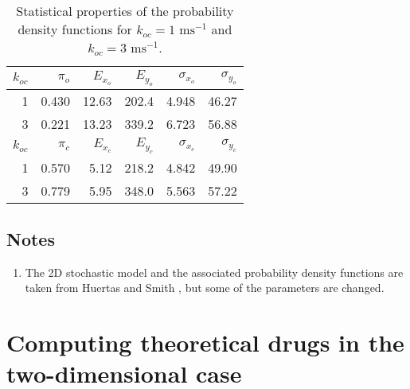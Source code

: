 

\begin{table}  \begin{center}
\begin{tabular}
[c]{|r|r|r|r||r|r|}\hline 
\rule{0pt}{4mm}   $k_{oc}$ & $\pi_o $ & $E_{x_o}$ & $E_{y_o}$
& $\sigma_{x_o}$ & $\sigma_{y_o}$
\\[1mm]\hline\hline
1 & 0.430 & 12.63 & 202.4 &4.948 &  46.27\\\hline
3 & 0.221 & 13.23 & 339.2 &6.723 &  56.88 \\ \hline \hline
\rule{0pt}{4mm} $k_{oc}$ & $\pi_c$ &$E_{x_c}$ & $E_{y_c}$ 
& $\sigma_{x_c}$ & $\sigma_{y_c}$
\\[1mm]\hline\hline
1 & 0.570& 5.12 & 218.2 &4.842 &  49.90\\\hline
3 & 0.779 &5.95& 348.0  &5.563 &  57.22\\\hline
\end{tabular}
 \end{center}
\caption{Statistical properties of the probability density functions 
for $k_{oc}=1 \text{ ms}^{-1}$ and  $k_{oc}=3 \text{ ms}^{-1}$.
\label{tab:more_open}}
\end{table}


\section{Notes}

\begin{enumerate}
\item The 2D stochastic model and the associated probability density functions are taken from Huertas and Smith \cite{Huertas2007}, but some of the parameters are changed.
\end{enumerate}

\chapter{Computing theoretical drugs in the two-dimensional case}



